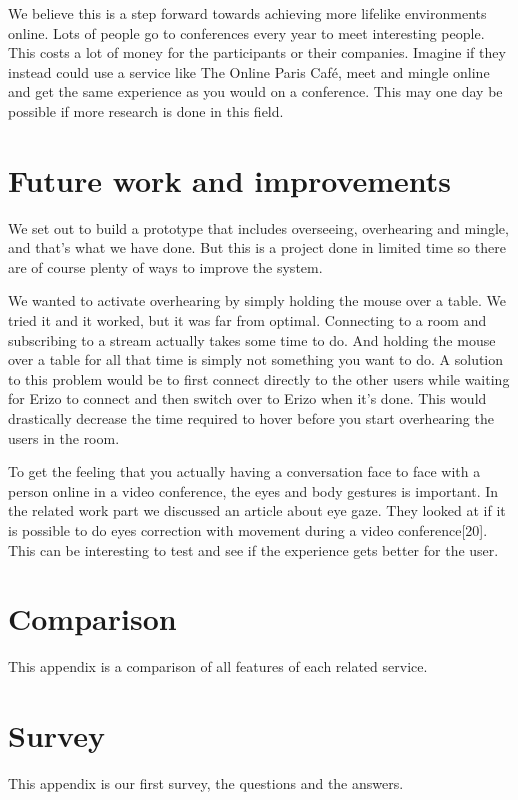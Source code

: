 \documentclass[12pt, titlepage]{article}
\begin{document}
We believe this is a step forward towards achieving more lifelike environments online. Lots of people go to conferences every year to meet interesting people. This costs a lot of money for the participants or their companies. Imagine if they instead could use a service like The Online Paris Café, meet and mingle online and get the same experience as you would on a conference. This may one day be possible if more research is done in this field.
\section{Future work and improvements}
We set out to build a prototype that includes overseeing, overhearing and mingle, and that's what we have done. But this is a project done in limited time so there are of course plenty of ways to improve the system.

We wanted to activate overhearing by simply holding the mouse over a table. We tried it and it worked, but it was far from optimal. Connecting to a room and subscribing to a stream actually takes some time to do. And holding the mouse over a table for all that time is simply not something you want to do. A solution to this problem would be to first connect directly to the other users while waiting for Erizo to connect and then switch over to Erizo when it's done. This would drastically decrease the time required to hover before you start overhearing the users in the room.

To get the feeling that you actually having a conversation face to face with a person online in a video conference, the eyes and body gestures is important. In the related work part we discussed an article about eye gaze. They looked at if it is possible to do eyes correction with movement during a video conference[20]. This can be interesting to test and see if the experience gets better for the user.

\newpage
\begin{appendices}
\section{Comparison}
This appendix is a comparison of all features of each related service.

\section{Survey}
This appendix is our first survey, the questions and the answers.


\end{appendices}
\end{document}
